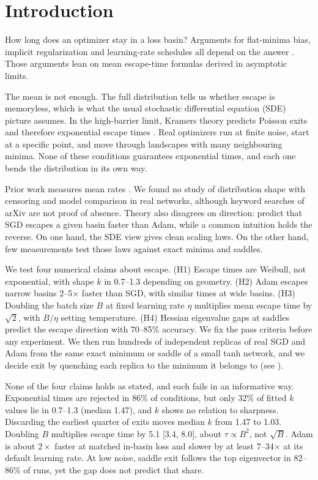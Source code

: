 \section{Introduction}
\label{sec:intro}

How long does an optimizer stay in a loss basin?
Arguments for flat-minima bias, implicit regularization and learning-rate schedules all depend on the answer \citep{xie2021diffusion,mori2022powerlaw,smith2018bayesian}.
Those arguments lean on mean escape-time formulas derived in asymptotic limits.

The mean is not enough.
The full distribution tells us whether escape is memoryless, which is what the usual stochastic differential equation (SDE) picture assumes.
In the high-barrier limit, Kramers theory predicts Poisson exits and therefore exponential escape times \citep{kramers1940brownian}.
Real optimizers run at finite noise, start at a specific point, and move through landscapes with many neighbouring minima.
None of these conditions guarantees exponential times, and each one bends the distribution in its own way.

Prior work measures mean rates \citep{xie2021diffusion,mori2022powerlaw,ibayashi2021exponential}.
We found no study of distribution shape with censoring and model comparison in real networks, although keyword searches of arXiv are not proof of absence.
Theory also disagrees on direction: \citet{zhou2020towards} predict that SGD escapes a given basin faster than Adam, while a common intuition holds the reverse.
On one hand, the SDE view gives clean scaling laws.
On the other hand, few measurements test those laws against exact minima and saddles.

We test four numerical claims about escape.
(H1) Escape times are Weibull, not exponential, with shape $k$ in 0.7--1.3 depending on geometry.
(H2) Adam escapes narrow basins 2--5$\times$ faster than SGD, with similar times at wide basins.
(H3) Doubling the batch size $B$ at fixed learning rate $\eta$ multiplies mean escape time by $\sqrt{2}$, with $B/\eta$ setting temperature.
(H4) Hessian eigenvalue gaps at saddles predict the escape direction with 70--85\% accuracy.
We fix the pass criteria before any experiment.
We then run hundreds of independent replicas of real SGD and Adam from the same exact minimum or saddle of a small tanh network, and we decide exit by quenching each replica to the minimum it belongs to (see ).

None of the four claims holds as stated, and each fails in an informative way.
Exponential times are rejected in 86\% of conditions, but only 32\% of fitted $k$ values lie in 0.7--1.3 (median 1.47), and $k$ shows no relation to sharpness.
Discarding the earliest quarter of exits moves median $k$ from 1.47 to 1.03.
Doubling $B$ multiplies escape time by 5.1 [3.4, 8.0], about $\tau\propto B^{2}$, not $\sqrt{B}$.
Adam is about $2\times$ faster at matched in-basin loss and slower by at least 7--34$\times$ at its default learning rate.
At low noise, saddle exit follows the top eigenvector in 82--86\% of runs, yet the gap does not predict that share.

